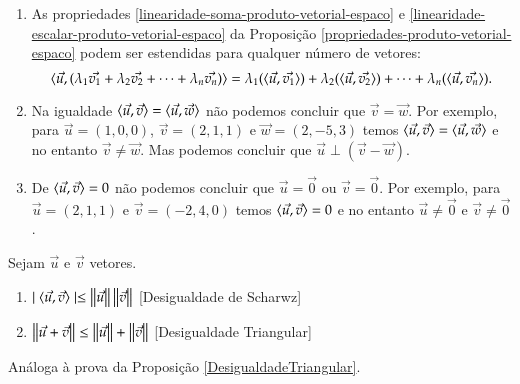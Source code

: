 \begin{observacao}
  \begin{enumerate}[label=({\alph*})]
    \item As propriedades \ref{linearidade-soma-produto-vetorial-espaco} e \ref{linearidade-escalar-produto-vetorial-espaco} da Proposi\c{c}\~ao \ref{propriedades-produto-vetorial-espaco} podem ser estendidas para qualquer n\'umero de vetores:
    \[
      \langle\vec{u}, (\lambda_1\vec{v_1} + \lambda_2\vec{v_2} + \cdots + \lambda_n\vec{v_n})\rangle = \lambda_1(\langle \vec{u}, \vec{v_1} \rangle) + \lambda_2(\langle \vec{u}, \vec{v_2} \rangle) + \cdots + \lambda_n(\langle \vec{u}, \vec{v_n} \rangle).
    \]
    \item Na igualdade $\langle \vec{u}, \vec{v} \rangle = \langle \vec{u}, \vec{w} \rangle$ n\~ao podemos concluir que $\vec{v} = \vec{w}$. Por exemplo, para $\vec{u} = (1, 0, 0)$, $\vec{v} = (2, 1, 1)$ e $\vec{w} = (2, -5, 3)$ temos $\langle \vec{u}, \vec{v} \rangle = \langle \vec{u}, \vec{w} \rangle$ e no entanto $\vec{v} \ne \vec{w}$. Mas podemos concluir que $\vec{u}\perp(\vec{v} - \vec{w})$.
    \item De $\langle \vec{u}, \vec{v} \rangle = 0$ n\~ao podemos concluir que $\vec{u} = \vec{0}$ ou $\vec{v} = \vec{0}$. Por exemplo, para $\vec{u} = (2, 1, 1)$ e $\vec{v} = (-2, 4, 0)$ temos $\langle \vec{u}, \vec{v} \rangle = 0$ e no entanto $\vec{u} \ne \vec{0}$ e $\vec{v} \ne \vec{0}$.
  \end{enumerate}
\end{observacao}

\begin{proposicao}Sejam $\vec{u}$ e $\vec{v}$ vetores.
  \begin{enumerate}
    \item $\mid\langle \vec{u}, \vec{v} \rangle\mid \le \left\Vert{\vec{u}}\right\Vert\left\Vert{\vec{v}}\right\Vert$ [Desigualdade de Scharwz]
    \item $\left\Vert{\vec{u} + \vec{v}}\right\Vert \le \left\Vert{\vec{u}}\right\Vert + \left\Vert{\vec{v}}\right\Vert$ [Desigualdade Triangular]
  \end{enumerate}
\end{proposicao}
\begin{prova}
  An\'aloga \`a prova da Proposi\c{c}\~ao \ref{DesigualdadeTriangular}.
\end{prova}


